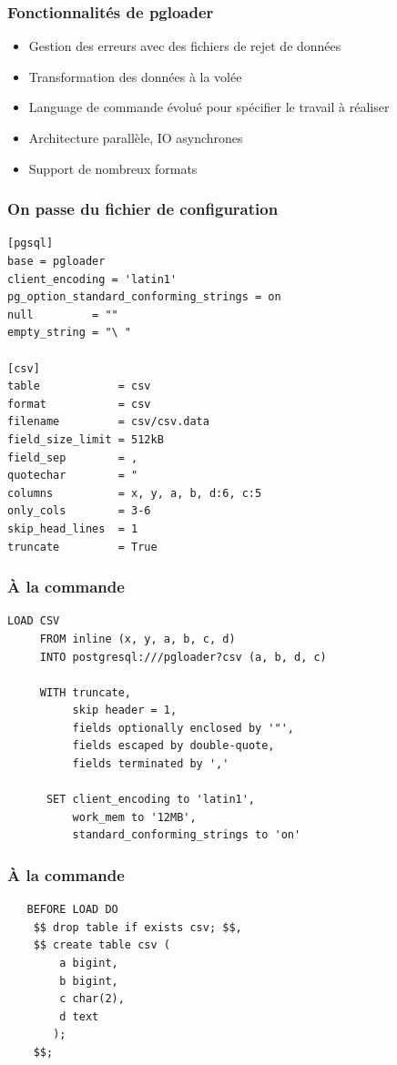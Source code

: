\documentclass{beamer}
\begin{document}
\begin{frame}[fragile]
  \frametitle{Fonctionnalités de pgloader}

  \vfill
  
  \begin{itemize}
  \item Gestion des erreurs avec des fichiers de rejet de données
  \item Transformation des données à la volée
  \item Language de commande évolué pour spécifier le travail à réaliser
  \item Architecture parallèle, IO asynchrones
  \item Support de nombreux formats
  \end{itemize}
  
\end{frame}

\begin{frame}[fragile]
  \frametitle{On passe du fichier de configuration}

  \begin{verbatim}
[pgsql]
base = pgloader
client_encoding = 'latin1'
pg_option_standard_conforming_strings = on
null         = ""
empty_string = "\ "
    
[csv]
table            = csv
format           = csv
filename         = csv/csv.data
field_size_limit = 512kB
field_sep        = ,
quotechar        = "
columns          = x, y, a, b, d:6, c:5
only_cols        = 3-6
skip_head_lines  = 1
truncate         = True
  \end{verbatim}
\end{frame}

\begin{frame}[fragile]
  \frametitle{À la commande}

  \begin{verbatim}
LOAD CSV
     FROM inline (x, y, a, b, c, d)
     INTO postgresql:///pgloader?csv (a, b, d, c)

     WITH truncate,
          skip header = 1,
          fields optionally enclosed by '"',
          fields escaped by double-quote,
          fields terminated by ','

      SET client_encoding to 'latin1',
          work_mem to '12MB',
          standard_conforming_strings to 'on'
  \end{verbatim}
\end{frame}

\begin{frame}[fragile]
  \frametitle{À la commande}

  \begin{verbatim}
   BEFORE LOAD DO
    $$ drop table if exists csv; $$,
    $$ create table csv (
        a bigint,
        b bigint,
        c char(2),
        d text
       );
    $$;
  \end{verbatim}
\end{frame}
\end{document}
